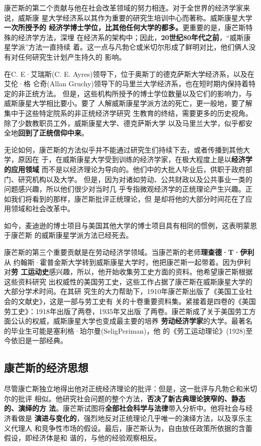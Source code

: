 康芒斯的第二个贡献与他在社会改革领域的努力相连。对于全世界的经济学家来说，威斯康
星大学经济系以其作为重要的研究生培训中心而著称。威斯康星大学\textbf{一次所授予的
经济学博士学位，比其他任何大学的都多。}更重要的是，康芒斯特殊的经济学方法，深埋
在经济系的架构中；因此，\textbf{20世纪80年代之前}，“威斯康星学派”方法一直持续
着。这一点与凡勃仑或米切尔形成了鲜明对比，他们俩人没有对任何研究生计划产生持久的
影响。

在C. E·艾瑞斯(C. E. Ayres)领导下，位于奥斯丁的德克萨斯大学经济系，以及在艾伦·格
仑奇(Allan Gruchy)领导下的马里兰大学经济系，也在短时期内保持着特定的非正统方法。
但是，这些机构所授予的博士学位数量以及它们的影响力，与威斯康星大学相比要小。要了
人解威斯康星学派方法的死亡，更一般地，要了解集中于这些特定院系的非正统经济学研究
生教育的终结，需要更多的历史视角。除了少数教职员工外，威斯康星大学、德克萨斯大学
以及马里兰大学，似乎都安全地\textbf{回到了正统信仰中来}。

无论如何，康芒斯的方法似乎并不能通过研究生们持续下去，或者传播到其他大学，原因在
于，在威斯康星大学受到训练的经济学家，在极大程度上是以\textbf{经济学的应用领域}
而不是以经济理论为导向的。他们中的大批人毕业后，供职于政府部门、研究机构以及大学。
但是，因为对诸如劳动、公共财政以及公共事业一类的问题感兴趣，所以他们很少对当时几
乎专指微观经济学的正统理论产生兴趣。正如我们将看到的那样，康芒斯批评正统理论，但
是却将他的大部分时间花在了应用领域和社会改革中。

如今，麦迪逊的博士项目与美国其他大学的博士项目具有相同的惯例，这表明蒙恩于康芒斯
的威斯康星学派方法已经死去。

康芒斯的第三个重要贡献是在劳动经济学领域。当康芒斯的老师\textbf{理查德·T·伊利}从
约翰斯·霍普金斯大学转到威斯康星大学时，他把康芒斯一起带着。因为伊利对\textbf{劳
工运动史}感兴趣，所以，他开始收集劳工史方面的资料。他希望康芒斯根据这些资料研究
出权威性的美国劳工史，这些工作占据了康芒斯在威斯康星大学的大部分学术时间。在其研
究生的大力帮助下，1910年康芒斯出版了《美国工业社会的文献史》，这是一部与劳工史有
关的十卷重要资料集。紧接着是四卷的《美国劳工史》：1918年出版了两卷，1935年又出版
了两卷。康芒斯成了关于美国劳工方面公认的权威，威斯康星大学也变成最主要的培养
\textbf{劳动经济学家}的大学。最著名的毕业生可能是塞利格·珀尔曼(SeligPeriman)，他
的《劳工运动理论》(1928)至今依旧是一部经典。

\subsection{康芒斯的经济思想}

尽管康亡斯独立地得出他对正统经济理论的批评：但是，这一批评与凡勃仑和米切尔的批评
相似。他研究社会问题的整个方法，\textbf{否决了新古典理论狭窄的、静态的、演绎的方
法}。康芒斯试图将\textbf{全部社会科学与法律}带入分析中。他将社会与经济看做是
\textbf{演进与变化的}，强烈地反对正统理论几乎唯一的演绎方法，以及享乐主义代理人
和竞争性市场的假设。最后，康芒斯认为，自由放任政策所依据的含蕾假设，即经济体是和
谐的，与他的经验观察相反。

